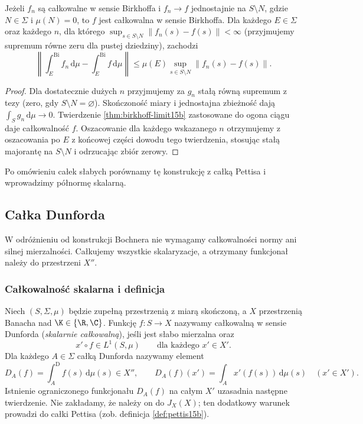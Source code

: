 \begin{wniosek}
\label{cor:birkhoff-uniform-limit15b}
Jeżeli $f_n$ są całkowalne w sensie Birkhoffa
i $f_n\to f$ jednostajnie na $S\setminus N$, gdzie
$N\in\Sigma$ i $\mu(N)=0$, to $f$ jest całkowalna
w sensie Birkhoffa. Dla każdego $E\in\Sigma$
oraz każdego $n$, dla którego
$\sup_{s\in S\setminus N}\|f_n(s)-f(s)\|<\infty$
(przyjmujemy supremum równe zeru dla pustej dziedziny),
zachodzi
\[
 \left\|\int_E^{\mathrm{Bi}}f_n\,\mathrm d\mu-
             \int_E^{\mathrm{Bi}}f\,\mathrm d\mu\right\|
 \le\mu(E)\sup_{s\in S\setminus N}\|f_n(s)-f(s)\|.
\]
\end{wniosek}
\begin{proof}
Dla dostatecznie dużych $n$ przyjmujemy za $g_n$
stałą równą supremum z tezy (zero, gdy
$S\setminus N=\varnothing$). Skończoność miary
i jednostajna zbieżność dają $\int_Sg_n\,\mathrm d\mu\to0$.
Twierdzenie \ref{thm:birkhoff-limit15b} zastosowane
do ogona ciągu daje całkowalność $f$. Oszacowanie
dla każdego wskazanego $n$ otrzymujemy z oszacowania
po $E$ z końcowej części dowodu tego twierdzenia,
stosując stałą majorantę na $S\setminus N$ i odrzucając
zbiór zerowy.
\end{proof}

Po omówieniu całek słabych porównamy tę konstrukcję
z całką Pettisa i wprowadzimy półnormę skalarną.

\subsection{Całka Dunforda}

W odróżnieniu od konstrukcji Bochnera nie wymagamy całkowalności
normy ani silnej mierzalności. Całkujemy wszystkie skalaryzacje,
a otrzymany funkcjonał należy do przestrzeni $X''$.

\subsubsection{Całkowalność skalarna i definicja}

\begin{definicja}
\label{def:dunford-pettis15b}
\label{def:dunford15b}
Niech $(S,\Sigma,\mu)$ będzie zupełną przestrzenią z miarą
skończoną, a $X$ przestrzenią Banacha nad $\K\in\{\R,\C\}$.
Funkcję $f:S\to X$ nazywamy całkowalną w sensie Dunforda
(\emph{skalarnie całkowalną}), jeśli jest słabo mierzalna oraz
\[
 x'\circ f\in L^1(S,\mu)\qquad\text{dla każdego }x'\in X'.
\]
Dla każdego $A\in\Sigma$ całką Dunforda nazywamy element
\[
 D_A(f)=\int_A^{\mathrm D} f(s)\,\mathrm d\mu(s)\in X'',
 \qquad
 D_A(f)(x')=\int_A x'(f(s))\,\mathrm d\mu(s)
 \quad(x'\in X').
\]
Istnienie ograniczonego funkcjonału $D_A(f)$ na całym $X'$
uzasadnia następne twierdzenie. Nie zakładamy, że należy on
do $J_X(X)$; ten dodatkowy warunek prowadzi do całki Pettisa
(zob. definicja \ref{def:pettis15b}).
\end{definicja}


